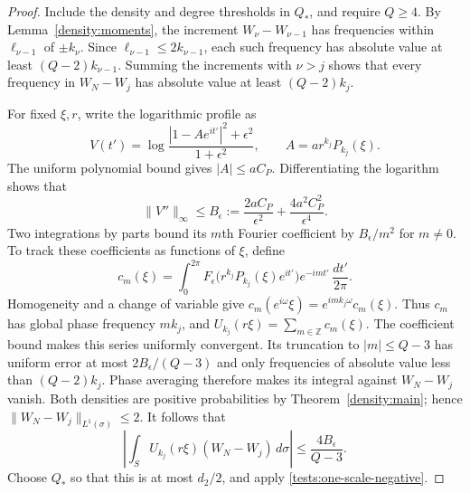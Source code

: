 \begin{proof}
Include the density and degree thresholds in $Q_*$, and require
$Q\ge4$.  By Lemma~\ref{density:moments}, the increment
$W_\nu-W_{\nu-1}$ has frequencies within $\ell_{\nu-1}$ of
$\pm k_\nu$.  Since $\ell_{\nu-1}\le2k_{\nu-1}$, each such
frequency has absolute value at least $(Q-2)k_{\nu-1}$.
Summing the increments with $\nu>j$ shows that every frequency in
$W_N-W_j$ has absolute value at least $(Q-2)k_j$.

For fixed $\xi,r$, write the logarithmic profile as
\[
 V(t')=\log\frac{|1-Ae^{it'}|^2+\epsilon^2}{1+\epsilon^2},
 \qquad A=a r^{k_j}P_{k_j}(\xi).
\]
The uniform polynomial bound gives $|A|\le aC_P$.  Differentiating
the logarithm shows that
\[
 \|V''\|_\infty\le
 B_\epsilon:=
 \frac{2aC_P}{\epsilon^2}
 +\frac{4a^2C_P^2}{\epsilon^4}.
\]
Two integrations by parts bound its $m$th Fourier coefficient by
$B_\epsilon/m^2$ for $m\ne0$. To track these coefficients as functions
of $\xi$, define
\[
 c_m(\xi)=\int_0^{2\pi}
 F_\epsilon\bigl(r^{k_j}P_{k_j}(\xi)e^{it'}\bigr)
 e^{-imt'}\,\frac{dt'}{2\pi}.
\]
Homogeneity and a change of variable give
$c_m(e^{i\omega}\xi)=e^{imk_j\omega}c_m(\xi)$.
Thus $c_m$ has global phase frequency $mk_j$, and
$U_{k_j}(r\xi)=\sum_{m\in\mathbb Z}c_m(\xi)$.
The coefficient bound makes this series uniformly convergent.
Its truncation to $|m|\le Q-3$ has uniform error at most
$2B_\epsilon/(Q-3)$ and only frequencies of absolute value less
than $(Q-2)k_j$. Phase averaging therefore makes its integral
against $W_N-W_j$ vanish.
Both densities are positive probabilities by
Theorem~\ref{density:main}; hence
$\|W_N-W_j\|_{L^1(\sigma)}\le2$.  It follows that
\[
 \left|\int_S U_{k_j}(r\xi)(W_N-W_j)\,d\sigma\right|
 \le\frac{4B_\epsilon}{Q-3}.
\]
Choose $Q_*$ so that this is at most $d_2/2$, and apply
\eqref{tests:one-scale-negative}.
\end{proof}
